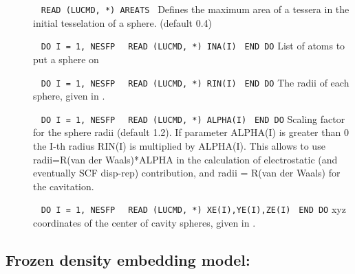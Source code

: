\begin{description}

\item[]\verb| |\newline
\verb|READ (LUCMD, *) AREATS|\verb| |\newline
Defines the maximum area of a tessera in the initial tesselation of a
sphere. (default 0.4)

\item[]\verb| |\newline
\verb|DO I = 1, NESFP|\newline
\verb|  READ (LUCMD, *) INA(I)|\verb| |\newline
\verb|END DO|\newline
List of atoms to put a sphere on

\item[]\verb| |\newline
\verb|DO I = 1, NESFP|\newline
\verb|  READ (LUCMD, *) RIN(I)|\verb| |\newline
\verb|END DO|\newline
The radii of each sphere, given in \angstrom{}.

\item[]\verb| |\newline
\verb|DO I = 1, NESFP|\newline
\verb|  READ (LUCMD, *) ALPHA(I)|\verb| |\newline
\verb|END DO|\newline
Scaling factor for the sphere radii (default 1.2). If parameter
ALPHA(I) is greater than 0 the I-th radius RIN(I) is multiplied by
ALPHA(I). This allows to use radii=R(van der Waals)*ALPHA in the
calculation of electrostatic (and eventually SCF disp-rep)
contribution, and radii = R(van der Waals) for the cavitation.

\item[]\verb| |\newline
\verb|DO I = 1, NESFP|\newline
\verb|  READ (LUCMD, *) XE(I),YE(I),ZE(I)|\verb| |\newline
\verb|END DO|\newline
xyz coordinates of the center of cavity spheres, given in \angstrom{}.

\end{description}


\subsection{Frozen density embedding model: }
\label{subsec:fde}

